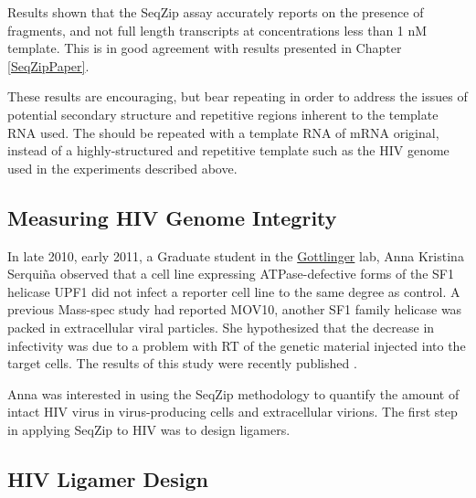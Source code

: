      Results shown that the SeqZip assay accurately reports on the presence of fragments, and not full length transcripts at concentrations less than 1 nM template. This is in good agreement with results presented in Chapter \ref{SeqZipPaper}. 

     These results are encouraging, but bear repeating in order to address the issues of potential secondary structure and repetitive regions inherent to the template RNA used. The should be repeated with a template RNA of mRNA original, instead of a highly-structured and repetitive template such as the HIV genome used in the experiments described above.

  \subsection{Measuring HIV Genome Integrity}
    \label{SeqZipMethod:subsec: Why use SeqZip to look at HIV genomes}

    In late 2010, early 2011, a Graduate student in the \href{http://profiles.umassmed.edu/profiles/display/133484}{Gottlinger} lab, Anna Kristina Serquiña observed that a cell line expressing ATPase-defective forms of the SF1 helicase UPF1 \citep{Bhattacharya2000} did not infect a reporter cell line to the same degree as control. A previous Mass-spec study had reported MOV10, another SF1 family helicase \citep{Gregersen2014} was packed in extracellular viral particles. She hypothesized that the decrease in infectivity was due to a problem with RT of the genetic material injected into the target cells. The results of this study were recently published \citep{Serquina2013}.

    Anna was interested in using the SeqZip methodology to quantify the amount of intact HIV virus in virus-producing cells and extracellular virions. The first step in applying SeqZip to HIV was to design ligamers.

	\subsection{HIV Ligamer Design}
    \label{SeqZipMethod:subsec: Design of HIV ligamers}


